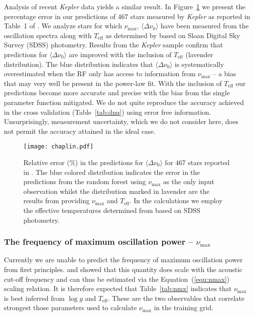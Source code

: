 Analysis of recent \emph{Kepler} data yields a similar result. In Figure~\ref{fig:chap} we present the percentage error in our predictions of $467$ stars measured by \emph{Kepler} as reported in Table~1 of \citet{2014ApJS..210....1C}. We analyze stars for which $\nu_{\max}$, ${\langle\Delta\nu_0\rangle}$ have been measured from the oscillation spectra along with  $T_{\text{eff}}$ as determined by \citet{2012ApJS..199...30P} based on Sloan Digital Sky Survey (SDSS) photometry. Results from the \emph{Kepler} sample confirm that predictions for ${\langle\Delta\nu_0\rangle}$ are improved with the inclusion of $T_{\text{eff}}$ (lavender distribution). The blue distribution indicates that ${\langle\Delta\nu_0\rangle}$ is systematically overestimated when the RF only has access to information from $\nu_{\max}$ -- a bias that may very well be present in the power-law fit. With the inclusion of $T_{\text{eff}}$ our predictions become more accurate and precise with the bias from the single parameter function mitigated. We do not quite reproduce the accuracy achieved in the cross validation (Table~\ref{tab:dnu}) using error free information.  Unsurprisingly,  measurement uncertainty, which we do not consider here, does not permit the accuracy attained in the ideal case.


\begin{figure}
\centering
\texttt{[image: chaplin.pdf]}
\caption[Relative error in predictions for $\Delta\nu$]{Relative error (\%) in the predictions for ${\langle\Delta\nu_0\rangle}$ for $467$ stars reported in \citet{2014ApJS..210....1C}. The blue colored distribution indicates the error in the predictions from the random forest using $\nu_{\max}$ as the only input observation whilst the distribution marked in lavender are the results from providing $\nu_{\max}$ and $T_{\text{eff}}$. In the calculations we employ the effective temperatures determined from \citet{2012ApJS..199...30P} based on  SDSS photometry.} 
\label{fig:chap}
\end{figure}



\subsubsection*{The frequency of maximum oscillation power -- $\nu_{\max}$} 


Currently we are unable to predict the frequency of maximum oscillation power from first principles. \citet{1991ApJ...368..599B} and \citet{1995A&A...293...87K} showed that this quantity does scale with the acoustic cut-off frequency and can thus be estimated via the Equation~(\ref{equ:nmax}) scaling relation. It is therefore expected that Table~\ref{tab:nmx} indicates that  $\nu_{\max}$ is best inferred from ${\log{} g}$  and $T_{\text{eff}}$. These are the two observables that correlate strongest those parameters used to calculate $\nu_{\max}$ in the training grid. 

